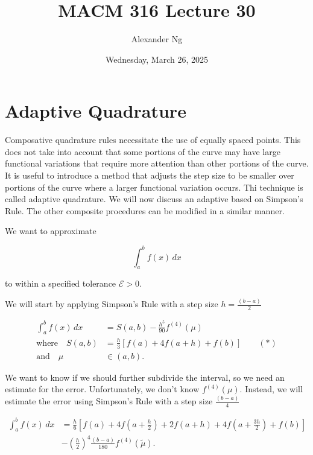 \documentclass[12pt]{article}
\newcommand{\bigEps}{\mathcal{E}}
\begin{document}
\title{MACM 316 Lecture 30}
\author{Alexander Ng}
\date{Wednesday, March 26, 2025}

\maketitle

\section{Adaptive Quadrature}
\label{sec:adaptive_quadrature}

Composative quadrature rules necessitate the use of equally spaced points. This
does not take into account that some portions of the curve may have large
functional variations that require more attention than other portions of the
curve. It is useful to introduce a method that adjusts the step size to be
smaller over portions of the curve where a larger functional variation occurs.
Thi technique is called adaptive quadrature. We will now discuss an adaptive
based on Simpson's Rule. The other composite procedures can be modified in a
similar manner.

We want to approximate 

\begin{equation*}
  \int_{a}^{b} f(x) \, dx
\end{equation*}

to within a specified tolerance $\bigEps > 0$.

We will start by applying Simpson's Rule with a step size $h=\frac{(b-a)}{2}$

\begin{align*}
  \int_{a}^{b} f(x) \, dx &= S(a,b) - \frac{h^5}{90}f^{(4)} (\mu)\\
  \text{where} \quad  S(a,b) &= \frac{h}{3}\left[f(a) + 4f(a+h) +f(b)\right]
  \qquad (*)\\
    \text{and} \quad  \mu &\in (a,b)
.\end{align*}

We want to know if we should further subdivide the interval, so we need an
estimate for the error. Unfortunately, we don't know $f^{(4)}(\mu)$. Instead, we
will estimate the error using Simpson's Rule with a step size $\frac{(b-a)}{4}$

\begin{align*}
  \int_{a}^{b} f(x) \, dx &= \frac{h}{6} \left[
    f(a) + 4f(a+\frac{h}{2}) + 2f(a+h) +4f(a+ \frac{3h}{2}) + f(b)
  \right] \\
                          &- (\frac{h}{2})^4 \frac{(b-a)}{180} f^{(4)} (\tilde{\mu})
.\end{align*}
\end{document}
